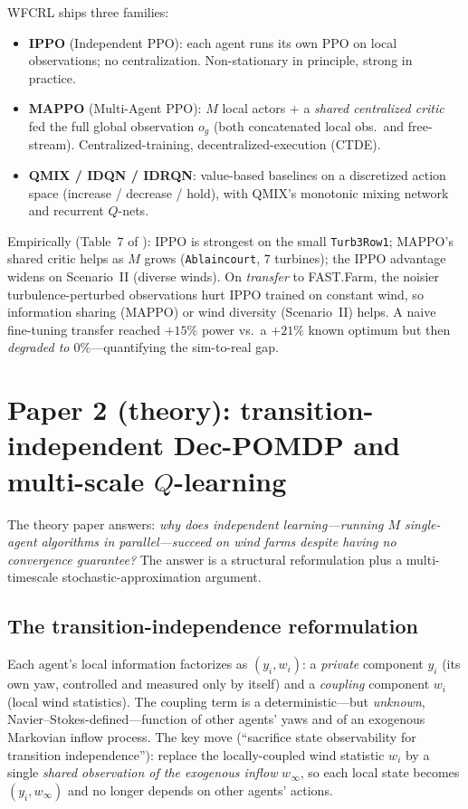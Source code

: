 \documentclass[11pt]{article}
\theoremstyle{plain}
\theoremstyle{definition}
\begin{document}
WFCRL ships three families:
\begin{itemize}[leftmargin=1.4em,itemsep=1pt]
  \item \textbf{IPPO} (Independent PPO): each agent runs its own PPO
  \cite{ppo} on local observations; no centralization. Non-stationary in
  principle, strong in practice.
  \item \textbf{MAPPO} (Multi-Agent PPO): $M$ local actors $+$ a
  \emph{shared centralized critic} fed the full global observation $o_g$
  (both concatenated local obs.\ and free-stream). Centralized-training,
  decentralized-execution (CTDE).
  \item \textbf{QMIX / IDQN / IDRQN}: value-based baselines on a discretized
  action space (increase / decrease / hold), with QMIX's monotonic mixing
  network and recurrent $Q$-nets.
\end{itemize}
Empirically (Table~7 of \cite{P1}): IPPO is strongest on the small
\texttt{Turb3Row1}; MAPPO's shared critic helps as $M$ grows
(\texttt{Ablaincourt}, $7$ turbines); the IPPO advantage widens on Scenario~II
(diverse winds). On \emph{transfer} to FAST.Farm, the noisier
turbulence-perturbed observations hurt IPPO trained on constant wind, so
information sharing (MAPPO) or wind diversity (Scenario~II) helps. A naive
fine-tuning transfer reached $+15\%$ power vs.\ a $+21\%$ known optimum but
then \emph{degraded to $0\%$}---quantifying the sim-to-real gap.

\section{Paper 2 (theory): transition-independent Dec-POMDP and multi-scale $Q$-learning}

The theory paper answers: \emph{why does independent learning---running $M$
single-agent algorithms in parallel---succeed on wind farms despite having no
convergence guarantee?} The answer is a structural reformulation plus a
multi-timescale stochastic-approximation argument.

\subsection{The transition-independence reformulation}

Each agent's local information factorizes as $(y_i, w_i)$: a \emph{private}
component $y_i$ (its own yaw, controlled and measured only by itself) and a
\emph{coupling} component $w_i$ (local wind statistics). The coupling term is a
deterministic---but \emph{unknown}, Navier--Stokes-defined---function of other
agents' yaws and of an exogenous Markovian inflow process. The key move
(``sacrifice state observability for transition independence''): replace the
locally-coupled wind statistic $w_i$ by a single \emph{shared observation of
the exogenous inflow} $w_\infty$, so each local state becomes $(y_i,w_\infty)$
and no longer depends on other agents' actions.
\end{document}
